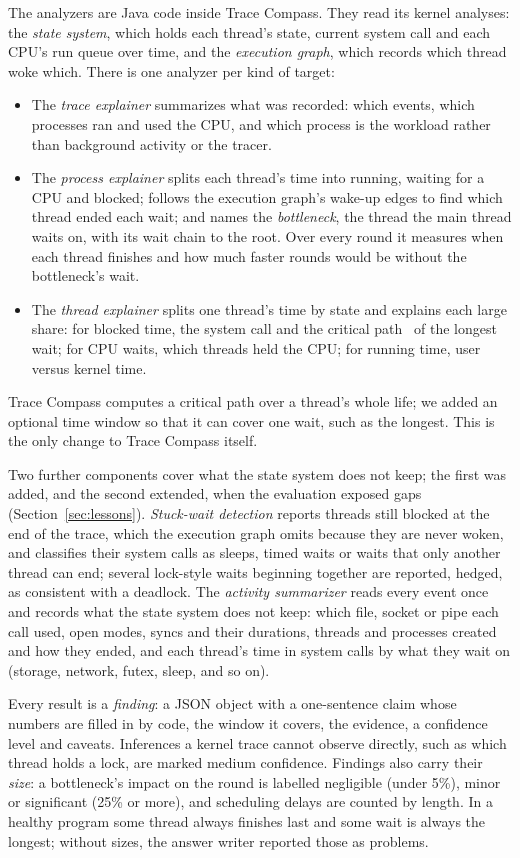 The analyzers are Java code inside Trace Compass. They read its kernel analyses: the \emph{state system}, which holds each thread's state, current system call and each CPU's run queue over time, and the \emph{execution graph}, which records which thread woke which. There is one analyzer per kind of target:
\begin{itemize}
  \item The \emph{trace explainer} summarizes what was recorded: which events, which processes ran and used the CPU, and which process is the workload rather than background activity or the tracer.
  \item The \emph{process explainer} splits each thread's time into running, waiting for a CPU and blocked; follows the execution graph's wake-up edges to find which thread ended each wait; and names the \emph{bottleneck}, the thread the main thread waits on, with its wait chain to the root. Over every round it measures when each thread finishes and how much faster rounds would be without the bottleneck's wait.
  \item The \emph{thread explainer} splits one thread's time by state and explains each large share: for blocked time, the system call and the critical path~\cite{giraldeau2016wait} of the longest wait; for CPU waits, which threads held the CPU; for running time, user versus kernel time.
\end{itemize}
Trace Compass computes a critical path over a thread's whole life; we added an optional time window so that it can cover one wait, such as the longest. This is the only change to Trace Compass itself.

Two further components cover what the state system does not keep; the first was added, and the second extended, when the evaluation exposed gaps (Section~\ref{sec:lessons}). \emph{Stuck-wait detection} reports threads still blocked at the end of the trace, which the execution graph omits because they are never woken, and classifies their system calls as sleeps, timed waits or waits that only another thread can end; several lock-style waits beginning together are reported, hedged, as consistent with a deadlock. The \emph{activity summarizer} reads every event once and records what the state system does not keep: which file, socket or pipe each call used, open modes, syncs and their durations, threads and processes created and how they ended, and each thread's time in system calls by what they wait on (storage, network, futex, sleep, and so on).

Every result is a \emph{finding}: a JSON object with a one-sentence claim whose numbers are filled in by code, the window it covers, the evidence, a confidence level and caveats. Inferences a kernel trace cannot observe directly, such as which thread holds a lock, are marked medium confidence. Findings also carry their \emph{size}: a bottleneck's impact on the round is labelled negligible (under 5\%), minor or significant (25\% or more), and scheduling delays are counted by length. In a healthy program some thread always finishes last and some wait is always the longest; without sizes, the answer writer reported those as problems.

